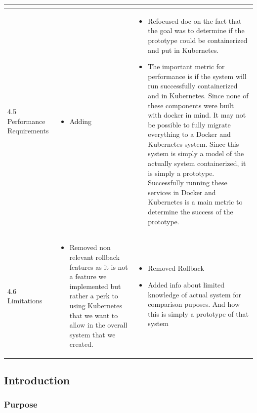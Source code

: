 \documentclass[onecolumn, draftclsnofoot,10pt, compsoc]{IEEEtran}
\begin{document}
\begin{longtable}{ | m{8em} | m{24em}| m{16em}| }
\begin{itemize}
\end{itemize}
\\
\hline
4.5 Performance Requirements&
\begin{itemize}
  \item Adding
\end{itemize}&
\begin{itemize}
    \item Refocused doc on the fact that the goal was to determine if the prototype could be containerized and put in Kubernetes.
  \item The important metric for performance is if the system will run successfully containerized and in Kubernetes. Since none of these components were built with docker in mind. It may not be possible to fully migrate everything to a Docker and Kubernetes system. Since this system is simply a model of the actually system containerized, it is simply a prototype. Successfully running these services in Docker and Kubernetes is a main metric to determine the success of the prototype.
  

\end{itemize}
\\
\hline
4.6 Limitations&
\begin{itemize}
  \item Removed non relevant rollback features as it is not a feature we implemented but rather a perk to using Kubernetes that we want to allow in the overall system that we created.
\end{itemize}&
\begin{itemize}
   \item Removed Rollback
\item Added info about limited knowledge of actual system for comparison puposes. And how this is simply a prototype of that system
  
\end{itemize}
\\
\hline


\end{longtable}
\clearpage


\subsection{Introduction}



\subsubsection{Purpose}
\end{document}
